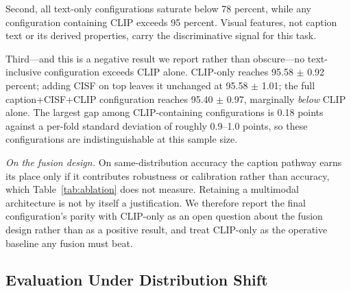 \documentclass[conference,a4paper]{IEEEtran}
\begin{document}
Second, all text-only configurations saturate below 78 percent, while any
configuration containing CLIP exceeds 95 percent. Visual features, not caption
text or its derived properties, carry the discriminative signal for this task.

Third---and this is a negative result we report rather than obscure---no
text-inclusive configuration exceeds CLIP alone. CLIP-only reaches
95.58 $\pm$ 0.92 percent; adding CISF on top leaves it unchanged at
95.58 $\pm$ 1.01; the full caption+CISF+CLIP configuration reaches
95.40 $\pm$ 0.97, marginally \emph{below} CLIP alone. The largest gap among
CLIP-containing configurations is 0.18 points against a per-fold standard
deviation of roughly 0.9--1.0 points, so these configurations are
indistinguishable at this sample size.

\emph{On the fusion design.} On same-distribution accuracy the caption
pathway earns its place only if it contributes robustness or calibration
rather than accuracy, which Table~\ref{tab:ablation} does not measure.
Retaining a multimodal architecture is not by itself a justification. We
therefore report the final configuration's parity with CLIP-only as an open
question about the fusion design rather than as a positive result, and treat
CLIP-only as the operative baseline any fusion must beat.

\subsection{Evaluation Under Distribution Shift}
\label{sec:shift}
\end{document}
